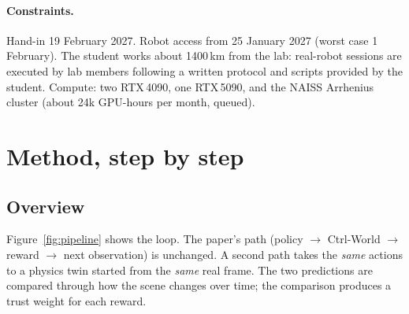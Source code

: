 \documentclass[11pt,a4paper]{article}
\theoremstyle{plain}
\theoremstyle{definition}
\theoremstyle{remark}
\begin{document}
\paragraph{Constraints.} Hand-in 19 February 2027. Robot access from 25 January 2027 (worst case 1 February). The student works about 1400\,km from the lab: real-robot sessions are executed by lab members following a written protocol and scripts provided by the student. Compute: two RTX\,4090, one RTX\,5090, and the NAISS Arrhenius cluster (about 24k GPU-hours per month, queued).

\section{Method, step by step}\label{sec:method}
\renewcommand{\thesubsection}{Step~\arabic{subsection}}
\renewcommand{\thesubsubsection}{\arabic{subsection}.\arabic{subsubsection}}

\subsection*{Overview}
Figure~\ref{fig:pipeline} shows the loop. The paper's path (policy $\to$ Ctrl-World $\to$ reward $\to$ next observation) is unchanged. A second path takes the \emph{same} actions to a physics twin started from the \emph{same} real frame. The two predictions are compared through how the scene changes over time; the comparison produces a trust weight for each reward.
\end{document}
